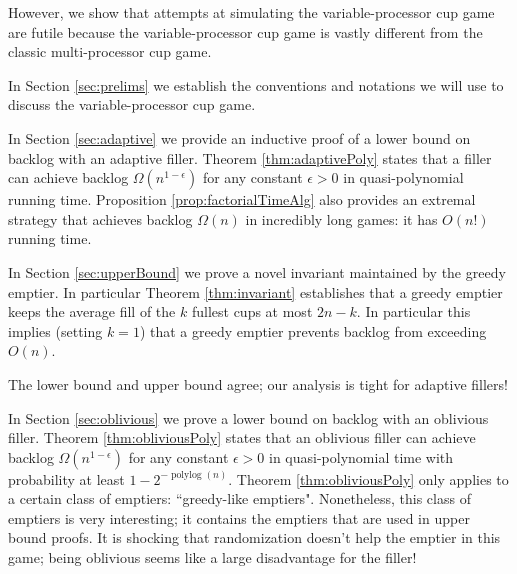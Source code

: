 \documentclass[twocolumn]{article}[10pt]
\renewcommand{\paragraph}[1]{\vspace{0.09in}\noindent{\bf \boldmath #1.}}
\DeclareMathOperator{\polylog}{\text{polylog}}
\begin{document}
However, we show that attempts at simulating the variable-processor cup
game are futile because the variable-processor cup game
is vastly different from the classic multi-processor cup game. 

\paragraph{Outline and Results}
In Section \ref{sec:prelims} we establish the conventions and
notations we will use to discuss the variable-processor cup game. 

In Section \ref{sec:adaptive} we provide an inductive proof of a
lower bound on backlog with an adaptive filler. Theorem
\ref{thm:adaptivePoly} states that a filler can achieve backlog
$\Omega(n^{1-\epsilon})$ for any constant $\epsilon > 0$ in
quasi-polynomial running time. Proposition
\ref{prop:factorialTimeAlg} also provides an extremal strategy
that achieves backlog $\Omega(n)$ in incredibly long games: it
has $O(n!)$ running time.

In Section \ref{sec:upperBound} we prove a novel invariant maintained
by the greedy emptier. In particular Theorem \ref{thm:invariant} establishes
that a greedy emptier keeps the average fill of the $k$ fullest cups at most
$2n-k$. In particular this implies (setting $k=1$) that a greedy emptier
prevents backlog from exceeding $O(n)$. 

The lower bound and upper bound agree; our analysis is tight for adaptive fillers!

In Section \ref{sec:oblivious} we prove a lower bound on backlog with an oblivious filler. 
Theorem \ref{thm:obliviousPoly} states that an oblivious filler can achieve
backlog $\Omega(n^{1-\epsilon})$ for any constant $\epsilon > 0$ in
quasi-polynomial time with probability at least $1-2^{-\polylog(n)}$.
Theorem \ref{thm:obliviousPoly} only applies to a certain class of emptiers:
``greedy-like emptiers". Nonetheless, this class of emptiers is very
interesting; it contains the emptiers that are used in upper bound proofs.
It is shocking that randomization doesn't help the emptier in this game;
being oblivious seems like a large disadvantage for the filler!
\end{document}
